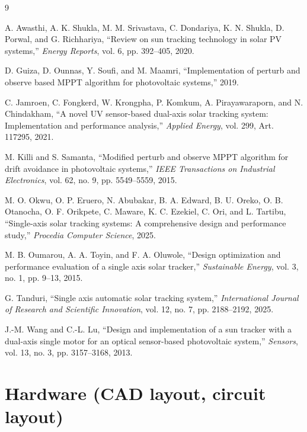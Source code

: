 \documentclass[journal]{IEEEtran}
\begin{document}
\begin{thebibliography}{9}

A. Awasthi, A. K. Shukla, M. M. Srivastava, C. Dondariya, K. N. Shukla, D. Porwal, and
G. Richhariya, ``Review on sun tracking technology in solar PV systems,'' \emph{Energy
Reports}, vol. 6, pp. 392--405, 2020.

D. Guiza, D. Ounnas, Y. Soufi, and M. Maamri, ``Implementation of perturb and observe
based MPPT algorithm for photovoltaic systems,'' 2019.

C. Jamroen, C. Fongkerd, W. Krongpha, P. Komkum, A. Pirayawaraporn, and N.
Chindakham, ``A novel UV sensor-based dual-axis solar tracking system: Implementation
and performance analysis,'' \emph{Applied Energy}, vol. 299, Art. 117295, 2021.

M. Killi and S. Samanta, ``Modified perturb and observe MPPT algorithm for drift
avoidance in photovoltaic systems,'' \emph{IEEE Transactions on Industrial
Electronics}, vol. 62, no. 9, pp. 5549--5559, 2015.

M. O. Okwu, O. P. Eruero, N. Abubakar, B. A. Edward, B. U. Oreko, O. B. Otanocha, O.
F. Orikpete, C. Maware, K. C. Ezekiel, C. Ori, and L. Tartibu, ``Single-axis solar
tracking systems: A comprehensive design and performance study,'' \emph{Procedia
Computer Science}, 2025.

M. B. Oumarou, A. A. Toyin, and F. A. Oluwole, ``Design optimization and performance
evaluation of a single axis solar tracker,'' \emph{Sustainable Energy}, vol. 3, no. 1,
pp. 9--13, 2015.

G. Tanduri, ``Single axis automatic solar tracking system,'' \emph{International
Journal of Research and Scientific Innovation}, vol. 12, no. 7, pp. 2188--2192, 2025.

J.-M. Wang and C.-L. Lu, ``Design and implementation of a sun tracker with a dual-axis
single motor for an optical sensor-based photovoltaic system,'' \emph{Sensors}, vol.
13, no. 3, pp. 3157--3168, 2013.

\end{thebibliography}

\appendices

\section{Hardware (CAD layout, circuit layout)}
\end{document}
